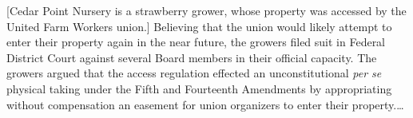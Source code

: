 %
%
%

[Cedar Point Nursery is a strawberry grower, whose property was accessed by the
United Farm Workers union.]
Believing that the union would likely attempt to enter their property again in
the near future, the growers filed suit in Federal District Court against
several Board members in their official capacity. The growers argued that the
access regulation effected an unconstitutional \textit{per se} physical taking
under the Fifth and Fourteenth Amendments by appropriating without compensation
an easement for union organizers to enter their property.\ldots


